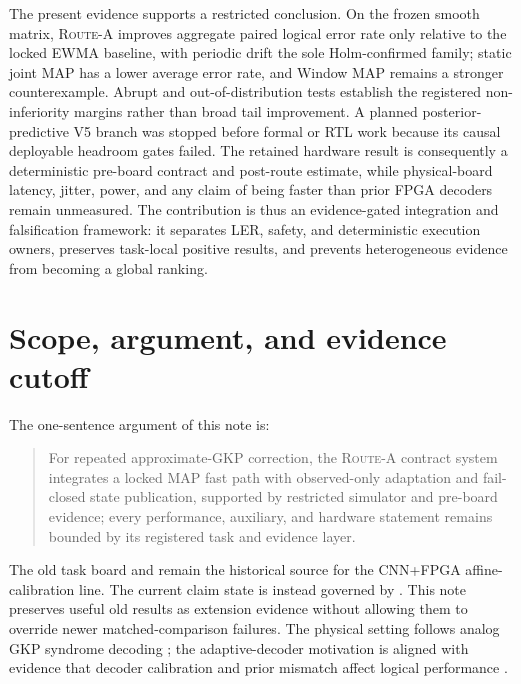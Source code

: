 \documentclass[11pt]{article}
\newcommand{\RouteA}{\textsc{Route-A}}
\begin{document}
The present evidence supports a restricted conclusion.  On the frozen smooth
matrix, \RouteA{} improves aggregate paired logical error rate only relative to
the locked EWMA baseline, with periodic drift the sole Holm-confirmed family;
static joint MAP has a lower average error rate, and Window MAP remains a
stronger counterexample.  Abrupt and out-of-distribution tests establish the
registered non-inferiority margins rather than broad tail improvement.  A
planned posterior-predictive V5 branch was stopped before formal or RTL work
because its causal deployable headroom gates failed.  The retained hardware
result is consequently a deterministic pre-board contract and post-route
estimate, while physical-board latency, jitter, power, and any claim of being
faster than prior FPGA decoders remain unmeasured.  The contribution is thus an
evidence-gated integration and falsification framework: it separates LER,
safety, and deterministic execution owners, preserves task-local positive
results, and prevents heterogeneous evidence from becoming a global ranking.

\section{Scope, argument, and evidence cutoff}

The one-sentence argument of this note is:

\begin{quote}
For repeated approximate-GKP correction, the \RouteA{} contract system
integrates a locked MAP fast path with observed-only adaptation and fail-closed
state publication, supported by restricted simulator and pre-board evidence;
every performance, auxiliary, and hardware statement remains bounded by its
registered task and evidence layer.
\end{quote}

The old task board and
 remain the historical
source for the CNN+FPGA affine-calibration line.  The current claim state is
instead governed by .  This note preserves useful
old results as extension evidence without allowing them to override newer
matched-comparison failures.  The physical setting follows analog GKP syndrome
decoding \cite{gkp2001,grimsmo2021}; the adaptive-decoder motivation is aligned
with evidence that decoder calibration and prior mismatch affect logical
performance \cite{chen2022,sivak2024}.
\end{document}
